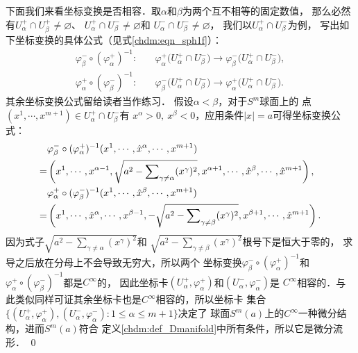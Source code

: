 下面我们来看坐标变换是否相容．取$\alpha$和$\beta$为两个互不相等的固定数值，
那么必然有$U_\alpha ^{+} \cap U_\beta ^{+} \neq \varnothing$、
$U_\alpha ^{+} \cap U_\beta ^{-} \neq \varnothing$和
$U_\alpha ^{-} \cap U_\beta ^{-} \neq \varnothing$，
我们以$U_\alpha ^{+} \cap U_\beta ^{-}$为例，
写出如下坐标变换的具体公式（见式\eqref{chdm:eqn_sph1f}）：
\begin{align*}
    \varphi^-_\beta \circ (\varphi^+_\alpha)^{-1}:& \quad \varphi^+_\alpha
      \bigl( U_\alpha ^{+} \cap U_\beta ^{-} \bigr) \to 
      \varphi^-_\beta \bigl( U_\alpha ^{+} \cap U_\beta ^{-} \bigr),  \\
    \varphi^+_\alpha \circ (\varphi^-_\beta)^{-1}:& \quad \varphi^-_\beta
      \bigl( U_\alpha ^{+} \cap U_\beta ^{-} \bigr) \to 
      \varphi^+_\alpha \bigl( U_\alpha ^{+} \cap U_\beta ^{-} \bigr) .
\end{align*}
其余坐标变换公式留给读者当作练习．
假设$\alpha < \beta$，对于$S^m$球面上的
点$(x^1,\cdots,x^{m+1})\in U_\alpha ^{+} \cap U_\beta ^{-}$有
$x^\alpha >0, \ x^\beta <0$，应用条件$|x|=a$可得坐标变换公式：
\begin{subequations}\label{chdm:eqn_sph1f}
\begin{align}
     &\varphi^-_\beta \circ (\varphi^+_\alpha)^{-1} (x^1,\cdots,\hat{x}^\alpha,\cdots,x^{m+1}) \notag \\
    =&\left(x^1,\cdots,x^{\alpha-1},\sqrt{a^2-\sum\nolimits_{ \gamma\neq \alpha}(x^\gamma)^2},
      x^{\alpha+1},\cdots,\hat{x}^\beta,\cdots,\hat{x}^{m+1}\right), \\
     &\varphi^+_\alpha \circ (\varphi^-_\beta)^{-1} (x^1,\cdots,\hat{x}^\beta,\cdots,x^{m+1}) \notag \\
    =&\left(x^1,\cdots,\hat{x}^\alpha,\cdots, x^{\beta-1},-\sqrt{a^2-\sum\nolimits_{\gamma\neq \beta}(x^\gamma)^2},
      x^{\beta+1},\cdots,\hat{x}^{m+1}\right) .
\end{align}
\end{subequations}
因为式子$\sqrt{a^2-\sum\nolimits_{ \gamma\neq \alpha}(x^\gamma)^2}$和
$\sqrt{a^2-\sum\nolimits_{\gamma\neq \beta}(x^\gamma)^2}$根号下是恒大于零的，
求导之后放在分母上不会导致无穷大，所以两个
坐标变换$\varphi^-_\beta \circ (\varphi^+_\alpha)^{-1}$和
$\varphi^+_\alpha \circ (\varphi^-_\beta)^{-1}$都是$C^\infty$的，
因此坐标卡$(U_\alpha ^{+}, \varphi_\alpha ^{+})$和$(U_\alpha ^{-}, \varphi_\alpha ^{-})$是
$C^\infty$相容的．与此类似同样可证其余坐标卡也是$C^\infty$相容的，所以坐标卡
集合$\{(U_\alpha ^{+}, \varphi_\alpha ^{+}),
(U_\alpha ^{-}, \varphi_\alpha ^{-}): 1\leqslant \alpha \leqslant m+1\}$决定了
球面$S^m(a)$上的$C^\infty$一种微分结构，进而$S^m(a)$符合
定义\ref{chdm:def_Dmanifold}中所有条件，所以它是微分流形．
\qed



